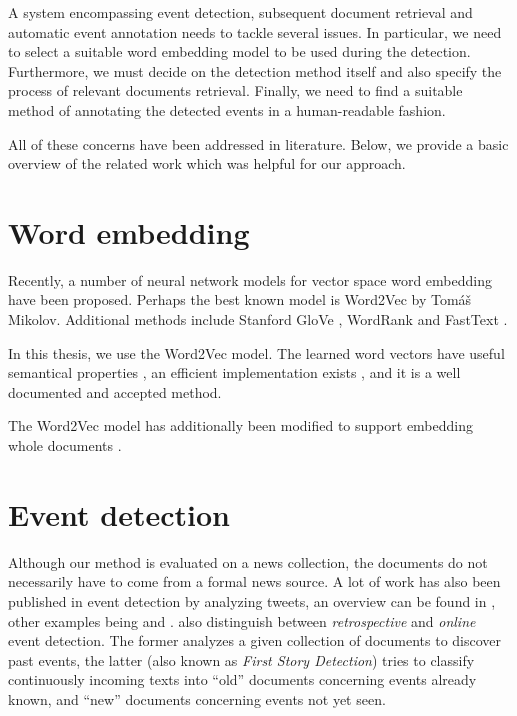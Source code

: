 A system encompassing event detection, subsequent document retrieval and automatic event annotation needs to tackle several issues. In particular, we need to select a suitable word embedding model to be used during the detection. Furthermore, we must decide on the detection method itself and also specify the process of relevant documents retrieval. Finally, we need to find a suitable method of annotating the detected events in a human-readable fashion.

All of these concerns have been addressed in literature. Below, we provide a basic overview of the related work which was helpful for our approach.


\section{Word embedding}
Recently, a number of neural network models for vector space word embedding have been proposed. Perhaps the best known model is Word2Vec \citep{word2vec} by Tomáš Mikolov. Additional methods include Stanford GloVe \citep{glove}, WordRank \citep{wordrank} and FastText \citep{fasttext}.

In this thesis, we use the Word2Vec model. The learned word vectors have useful semantical properties \citep{distributed-representations, linguistic-regularities}, an efficient implementation exists \citep{gensim}, and it is a well documented and accepted method.

The Word2Vec model has additionally been modified to support embedding whole documents \citep{doc2vec}.

\section{Event detection} \label{sec:related-event-detection}
Although our method is evaluated on a news collection, the documents do not necessarily have to come from a formal news source. A lot of work has also been published in event detection by analyzing tweets, an overview can be found in \cite{twitter-survey}, other examples being \cite{ifrim} and \cite{brigadir}. \cite{twitter-survey} also distinguish between \textit{retrospective} and \textit{online} event detection. The former analyzes a given collection of documents to discover past events, the latter (also known as \textit{First Story Detection}) tries to classify continuously incoming texts into ``old'' documents concerning events already known, and ``new'' documents concerning events not yet seen.

